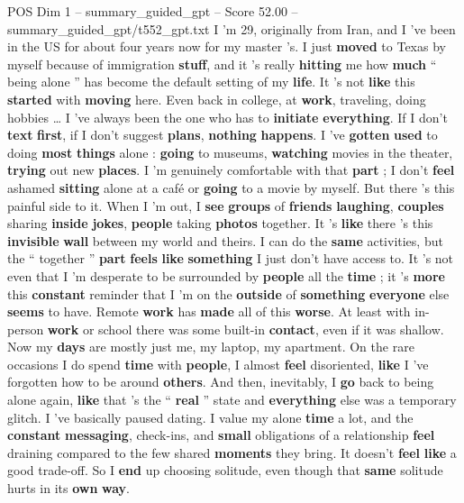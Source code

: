 \begin{textsample}{POS Dim 1 – summary\_guided\_gpt – Score 52.00 – summary\_guided\_gpt/t552\_gpt.txt}  \label{ex:f1_pos_027}
I ’m 29, originally from Iran, and I ’ve been in the US for about four years now for my master ’s.
I just \textbf{moved} to Texas by myself because of immigration \textbf{stuff}, and it ’s really \textbf{hitting} me how \textbf{much} “ being alone ” has become the default setting of my \textbf{life}.
It ’s not \textbf{like} this \textbf{started} with \textbf{moving} here.
Even back in college, at \textbf{work}, traveling, doing hobbies … I ’ve always been the one who has to \textbf{initiate} \textbf{everything}.
If I don't \textbf{text} \textbf{first}, if I don't suggest \textbf{plans}, \textbf{nothing} \textbf{happens}.
I ’ve \textbf{gotten} \textbf{used} to doing \textbf{most} \textbf{things} alone : \textbf{going} to museums, \textbf{watching} movies in the theater, \textbf{trying} out new \textbf{places}.
I ’m genuinely comfortable with that \textbf{part} ; I don't \textbf{feel} ashamed \textbf{sitting} alone at a café or \textbf{going} to a movie by myself.
But there ’s this painful side to it.
When I ’m out, I \textbf{see} \textbf{groups} of \textbf{friends} \textbf{laughing}, \textbf{couples} sharing \textbf{inside} \textbf{jokes}, \textbf{people} taking \textbf{photos} together.
It ’s \textbf{like} there ’s this \textbf{invisible} \textbf{wall} between my world and theirs.
I can do the \textbf{same} activities, but the “ together ” \textbf{part} \textbf{feels} \textbf{like} \textbf{something} I just don't have access to.
It ’s not even that I ’m desperate to be surrounded by \textbf{people} all the \textbf{time} ; it ’s \textbf{more} this \textbf{constant} reminder that I ’m on the \textbf{outside} of \textbf{something} \textbf{everyone} else \textbf{seems} to have.
Remote \textbf{work} has \textbf{made} all of this \textbf{worse}.
At least with in-person \textbf{work} or school there was some built-in \textbf{contact}, even if it was shallow.
Now my \textbf{days} are mostly just me, my laptop, my apartment.
On the rare occasions I do spend \textbf{time} with \textbf{people}, I almost \textbf{feel} disoriented, \textbf{like} I ’ve forgotten how to be around \textbf{others}.
And then, inevitably, I \textbf{go} back to being alone again, \textbf{like} that ’s the “ \textbf{real} ” state and \textbf{everything} else was a temporary glitch.
I ’ve basically paused dating.
I value my alone \textbf{time} a lot, and the \textbf{constant} \textbf{messaging}, check-ins, and \textbf{small} obligations of a relationship \textbf{feel} draining compared to the few shared \textbf{moments} they bring.
It doesn't \textbf{feel} \textbf{like} a good trade-off.
So I \textbf{end} up choosing solitude, even though that \textbf{same} solitude hurts in its \textbf{own} \textbf{way}.

\end{textsample}
